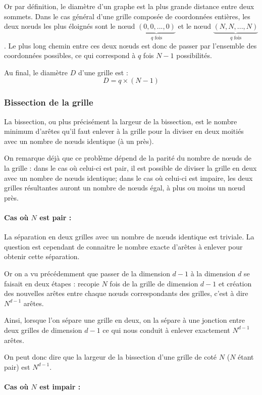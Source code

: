 Or par définition, le diamètre d'un graphe est la plus grande distance entre deux sommets. Dans le cas général d'une grille composée de coordonnées entières, les deux nœuds les plus éloignés sont le nœud $\underbrace{(0,0,...,0)}_{q \text{ fois}}$ et le nœud $\underbrace{(N,N,...,N)}_{q \text{ fois}}$. Le plus long chemin entre ces deux nœuds est donc de passer par l'ensemble des coordonnées possibles, ce qui correspond à $q$ fois $N-1$ possibilités.

Au final, le diamètre $D$ d'une grille est : $$D = q\times(N-1)$$

\subsubsection{Bissection de la grille}
La bissection, ou plus précisément la largeur de la bissection, est le nombre minimum d'arêtes qu'il faut enlever à la grille pour la diviser en deux moitiés avec un nombre de nœuds identique (à un près).

On remarque déjà que ce problème dépend de la parité du nombre de nœuds de la grille : dans le cas où celui-ci est pair, il est possible de diviser la grille en deux avec un nombre de nœuds identique; dans le cas où celui-ci est impaire, les deux grilles résultantes auront un nombre de nœuds égal, à plus ou moins un nœud près.

\paragraph{Cas où $N$ est pair :}

La séparation en deux grilles avec un nombre de nœuds identique est triviale. La question est cependant de connaitre le nombre exacte d'arêtes à enlever pour obtenir cette séparation.

Or on a vu précédemment que passer de la dimension $d-1$ à la dimension $d$ se faisait en deux étapes : recopie $N$ fois de la grille de dimension $d-1$ et création des nouvelles arêtes entre chaque nœuds correspondants des grilles, c'est à dire $N^{d-1}$ arêtes.

Ainsi, lorsque l'on sépare une grille en deux, on la sépare à une jonction entre deux grilles de dimension $d-1$ ce qui nous conduit à enlever exactement $N^{d-1}$ arêtes.

On peut donc dire que la largeur de la bissection d'une grille de coté $N$ ($N$ étant pair) est $N^{d-1}$.

\paragraph{Cas où $N$ est impair :}

